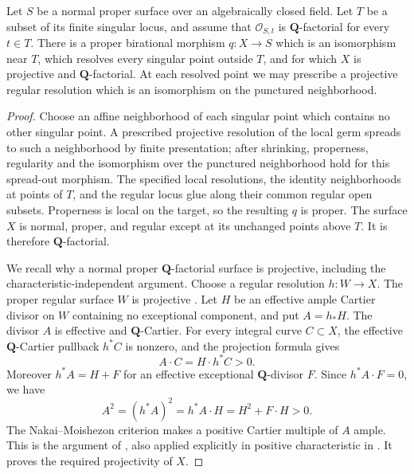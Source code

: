\begin{lemma}
\label{D:Qfactorial-partial-resolution}
Let $S$ be a normal proper surface over an algebraically closed field.
Let $T$ be a subset of its finite singular locus, and assume that
$\mathcal O_{S,t}$ is $\mathbf Q$-factorial for every $t\in T$.
There is a proper birational morphism $q:X\to S$ which is an
isomorphism near $T$, which resolves every singular point outside
$T$, and for which $X$ is projective and $\mathbf Q$-factorial.
At each resolved point we may prescribe a projective regular
resolution which is an isomorphism on the punctured neighborhood.
\end{lemma}
\begin{proof}
Choose an affine neighborhood of each singular point which contains
no other singular point.  A prescribed projective resolution of
the local germ spreads to such a neighborhood by finite presentation;
after shrinking, properness, regularity and the isomorphism over
the punctured neighborhood hold for this spread-out morphism.
The specified local resolutions, the
identity neighborhoods at points of $T$, and the regular locus
glue along their common regular open subsets.  Properness is local
on the target, so the resulting $q$ is proper.  The surface $X$ is
normal, proper, and regular except at its unchanged points above
$T$.  It is therefore $\mathbf Q$-factorial.

We recall why a normal proper $\mathbf Q$-factorial surface is
projective, including the characteristic-independent argument.
Choose a regular resolution $h:W\to X$.  The proper regular
surface $W$ is projective
\cite[Lemma 54.16.11, tag 0C5P]{StacksDSurfaceResolution}.
Let $H$ be an effective ample Cartier divisor on $W$ containing
no exceptional component, and put $A=h_*H$.
The divisor $A$ is effective and $\mathbf Q$-Cartier.
For every integral curve $C\subset X$, the effective
$\mathbf Q$-Cartier pullback $h^*C$ is nonzero, and the projection
formula gives
\[
 A\cdot C=H\cdot h^*C>0.
\]
Moreover $h^*A=H+F$ for an effective exceptional
$\mathbf Q$-divisor $F$.  Since $h^*A\cdot F=0$, we have
\[
 A^2=(h^*A)^2=h^*A\cdot H=H^2+F\cdot H>0.
\]
The Nakai--Moishezon criterion makes a positive Cartier multiple
of $A$ ample.  This is the argument of
\cite[Lemma 2.2, p. 344]{C_Fujino2012}, also applied explicitly
in positive characteristic in
\cite[proof of Theorem 5.3, p. 50]{C_Tanaka2014}.
It proves the required projectivity of $X$.
\end{proof}

